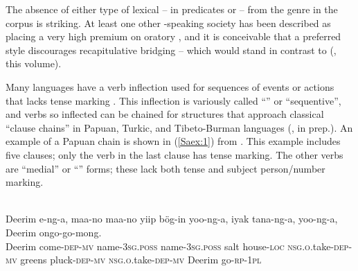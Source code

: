 \documentclass[output=paper]{LSP/langsci}
\begin{document}
The absence of either type of lexical  -- in predicates or  -- from the  genre in the corpus is striking. At least one other -speaking society has been described as placing a very high premium on oratory \citep{Albert1964}, and it is conceivable that a preferred   style discourages recapitulative bridging -- which would stand in contrast to  (\citeauthor{emlen18}, this volume). 

Many  languages have a verb inflection used for sequences of events or actions that lacks tense marking \citep{Dalgish1979}. This inflection is variously called ``'' or ``sequentive'', and verbs so inflected can be chained for structures that approach classical ``clause chains'' in Papuan, Turkic, and Tibeto-Burman languages (\citeauthor{sarvasyforth}, in prep.). An example of a Papuan chain is shown in (\ref{Saex:1}) from . This example includes five clauses; only the verb in the last clause has tense marking. The other verbs are ``medial'' or ``'' forms; these lack both tense and subject person\slash number marking.

\begin{exe}
	\ex	\label{Saex:1}
\\
\gll		Deerim e-ng-a, maa-no maa-no yiip bög-in yoo-ng-a, iyak tana-ng-a, yoo-ng-a, Deerim ongo-go-mong.\\
			Deerim come-\textsc{dep}-\textsc{mv} name-\textsc{3sg.poss} name-\textsc{3sg.poss} salt house-\textsc{loc} \textsc{nsg.o.}take\textsc{-dep}-\textsc{mv} greens pluck-\textsc{dep}-\textsc{mv } \textsc{nsg.o.}take\textsc{-dep}-\textsc{mv} Deerim go-\textsc{rp}-\textsc{1pl}\\
		\glt	{} \citep[][252]{Sarvasy2017}
\end{exe}
\end{document}
